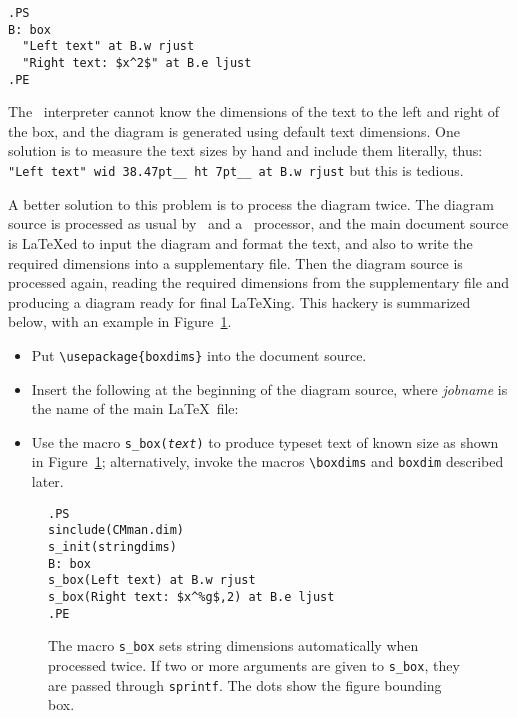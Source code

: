 \begin{verbatim}
.PS
B: box
  "Left text" at B.w rjust
  "Right text: $x^2$" at B.e ljust
.PE
\end{verbatim}

The \pic\ interpreter cannot know the dimensions of the text to the left
and right of the box, and the diagram is generated using
default text dimensions.  One solution is to measure the text sizes by hand and
include them literally, thus:\hfill\break
\hbox{}\quad%
\verb|"Left text" wid 38.47pt__ ht 7pt__ at B.w rjust|\hfill\break
but this is tedious.

A better solution to this problem is to process the diagram twice.  The
diagram source is processed as usual by \Mfour\ and a \pic\ processor, and the
main document source is \LaTeX{}ed to input the diagram and format the
text, and also to write the required dimensions into a supplementary file.
Then the diagram source is processed again, reading the required
dimensions from the supplementary file and producing a diagram ready
for final \LaTeX{}ing.  This hackery is summarized below, with an example
in Figure~\ref{stringdim}.
\enlargethispage{\baselineskip}
\begin{itemize}
\item Put \verb|\usepackage{boxdims}| into the document source.
\item Insert the following at the beginning of the diagram source,
 where {\sl jobname} is the name of the main \LaTeX\ file:\hfill\break
\item Use the macro {\tt s\_box({\sl text})} to produce
 typeset text of known size as shown in Figure~\ref{stringdim};
 alternatively, invoke the macros
 \verb|\boxdims| and \verb|boxdim| described later.
\end{itemize}
\begin{figure}[h!t]
   \parbox{3.5in}{\small\tt.PS\\
     sinclude(CMman.dim)\\
     s\_init(stringdims)\\
     B: box\\
       \hbox{}\quad s\_box(Left text) at B.w rjust\\
       \hbox{}\quad s\_box(Right text:\ \$x\^{}{\%g}\$,2) at B.e ljust\\
     .PE}%
   \hfill\llap{\raise-0.25in\hbox{ }}%
   \caption{The macro {\tt s\_box} sets string dimensions automatically
    when processed twice.  If two or more arguments are
    given to {\tt s\_box}, they
    are passed through {\tt sprintf}.  The dots show the figure bounding box.}
   \label{stringdim}
   \end{figure}

